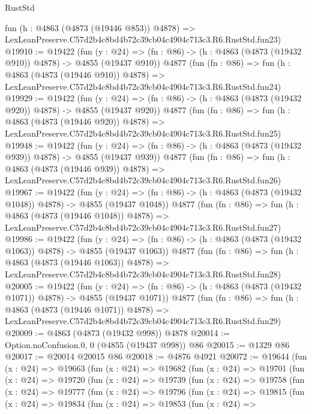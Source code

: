 \begin{lexlean}{RustStd}
\begin{coremodule}
    fun (h : @4863 (@4873 (@19446 @853)) @4878) =>
    LexLeanPreserve.C57d2b4c8bd4b72c39cb04c4904c713c3.R6.RustStd.fun23)
@19910 := @19422
    (fun (y : @24) => (fn : @86) -> (h : @4863 (@4873 (@19432 @910)) @4878) -> @4855 (@19437 @910))
    @4877
    (fun (fn : @86) =>
    fun (h : @4863 (@4873 (@19446 @910)) @4878) =>
    LexLeanPreserve.C57d2b4c8bd4b72c39cb04c4904c713c3.R6.RustStd.fun24)
@19929 := @19422
    (fun (y : @24) => (fn : @86) -> (h : @4863 (@4873 (@19432 @920)) @4878) -> @4855 (@19437 @920))
    @4877
    (fun (fn : @86) =>
    fun (h : @4863 (@4873 (@19446 @920)) @4878) =>
    LexLeanPreserve.C57d2b4c8bd4b72c39cb04c4904c713c3.R6.RustStd.fun25)
@19948 := @19422
    (fun (y : @24) => (fn : @86) -> (h : @4863 (@4873 (@19432 @939)) @4878) -> @4855 (@19437 @939))
    @4877
    (fun (fn : @86) =>
    fun (h : @4863 (@4873 (@19446 @939)) @4878) =>
    LexLeanPreserve.C57d2b4c8bd4b72c39cb04c4904c713c3.R6.RustStd.fun26)
@19967 := @19422
    (fun (y : @24) =>
    (fn : @86) -> (h : @4863 (@4873 (@19432 @1048)) @4878) -> @4855 (@19437 @1048))
    @4877
    (fun (fn : @86) =>
    fun (h : @4863 (@4873 (@19446 @1048)) @4878) =>
    LexLeanPreserve.C57d2b4c8bd4b72c39cb04c4904c713c3.R6.RustStd.fun27)
@19986 := @19422
    (fun (y : @24) =>
    (fn : @86) -> (h : @4863 (@4873 (@19432 @1063)) @4878) -> @4855 (@19437 @1063))
    @4877
    (fun (fn : @86) =>
    fun (h : @4863 (@4873 (@19446 @1063)) @4878) =>
    LexLeanPreserve.C57d2b4c8bd4b72c39cb04c4904c713c3.R6.RustStd.fun28)
@20005 := @19422
    (fun (y : @24) =>
    (fn : @86) -> (h : @4863 (@4873 (@19432 @1071)) @4878) -> @4855 (@19437 @1071))
    @4877
    (fun (fn : @86) =>
    fun (h : @4863 (@4873 (@19446 @1071)) @4878) =>
    LexLeanPreserve.C57d2b4c8bd4b72c39cb04c4904c713c3.R6.RustStd.fun29)
@20009 := @4863 (@4873 (@19432 @998)) @4878
@20014 := Option.noConfusion.{0, 0} (@4855 (@19437 @998)) @86
@20015 := @1329 @86
@20017 := @20014 @20015 @86
@20018 := @4876 @4921
@20072 := @19644
    (fun (x : @24) =>
    @19663
      (fun (x : @24) =>
      @19682
        (fun (x : @24) =>
        @19701
          (fun (x : @24) =>
          @19720
            (fun (x : @24) =>
            @19739
              (fun (x : @24) =>
              @19758
                (fun (x : @24) =>
                @19777
                  (fun (x : @24) =>
                  @19796
                    (fun (x : @24) =>
                    @19815
                      (fun (x : @24) =>
                      @19834
                        (fun (x : @24) =>
                        @19853
                          (fun (x : @24) =>

\end{coremodule}
\end{lexlean}
